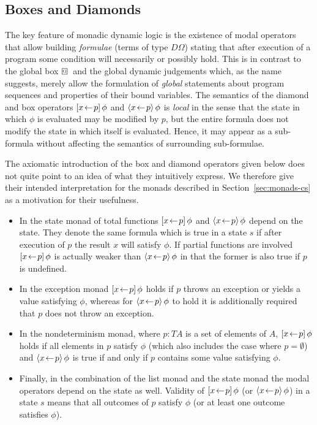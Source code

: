 \subsection{Boxes and Diamonds}
\label{sec:box-diamond}

The key feature of monadic dynamic logic is the existence of modal operators
that allow building \emph{formulae} (\IE terms of type $D\Omega$) stating that after
execution of a program some condition will necessarily or possibly hold. This is
in contrast to the global box $\gbox$ and the global dynamic judgements which, as
the name suggests, merely allow the formulation of \emph{global} statements
about program sequences and properties of their bound variables. The semantics
of the diamond and box operators $[x\!\gets\! p]\,{\phi}$ and $\langle x\!\gets\!
  p\rangle\,{\phi}$ is \emph{local} in the sense that the state in which $\phi$ is evaluated
may be modified by $p$, but the entire formula does not modify the state in
which itself is evaluated. Hence, it may appear as a sub-formula without
affecting the semantics of surrounding sub-formulae.

\begin{expl}
  The axiomatic introduction of the box and diamond operators given below does
  not quite point to an idea of what they intuitively express. We therefore give
  their intended interpretation for the monads described in
  Section~\ref{sec:monads-cs} as a motivation for their usefulness.
  \begin{itemize}
  \item In the state monad of total functions $[x\!\gets\! p]\,{\phi}$ and
    $\langle x\!\gets\! p\rangle\,{\phi}$ depend on the state. They denote the same
    formula which is true in a state $s$ if after execution of $p$ the result
    $x$ will satisfy $\phi$. If partial functions are involved $[x\!\gets\!
      p]\,{\phi}$ is actually weaker than $\langle x\!\gets\! p\rangle\,{\phi}$ in that the former
    is also true if $p$ is undefined.
  \item In the exception monad $[x\!\gets\! p]\,{\phi}$ holds if $p$ throws an
    exception or yields a value satisfying $\phi$, whereas for $\langle x\!\gets\!
      p\rangle\,{\phi}$ to hold it is additionally required that $p$ does not throw an
    exception.
  \item In the nondeterminism monad, where $p : T A$ is a set of elements of
    $A$, $[x\!\gets\! p]\,{\phi}$ holds if all elements in $p$ satisfy $\phi$ (which
    also includes the case where $p = \emptyset$) and  $\langle x\!\gets\! p\rangle\,{\phi}$ is true
    if and only if $p$ contains some value satisfying $\phi$.
  \item Finally, in the combination of the list monad and the state monad the
    modal operators depend on the state as well. Validity of $[x\!\gets\!
      p]\,{\phi}$ (or $\langle x\!\gets\! p\rangle\,{\phi}$) in a state $s$ means that all outcomes
    of $p$ satisfy $\phi$ (or at least one outcome satisfies $\phi$).
  \end{itemize}
\end{expl}


